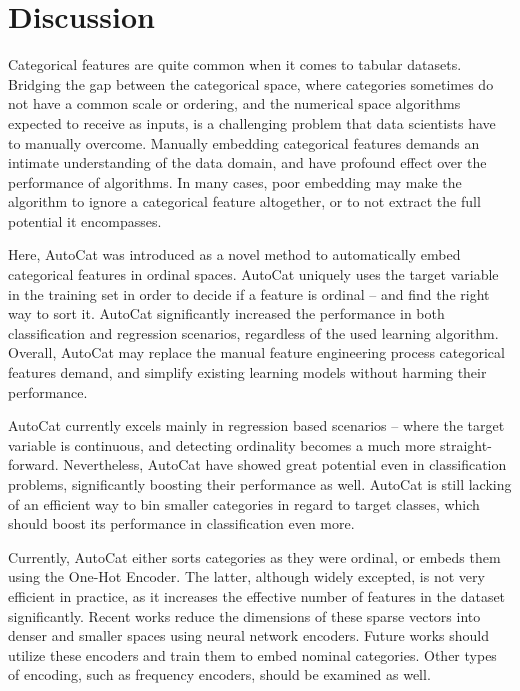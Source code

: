 \documentclass{article}
\begin{document}
\section{Discussion}
Categorical features are quite common when it comes to tabular datasets. Bridging the gap between the categorical space, where categories sometimes do not have a common scale or ordering, and the numerical space algorithms expected to receive as inputs, is a challenging problem that data scientists have to manually overcome. Manually embedding categorical features demands an intimate understanding of the data domain, and have profound effect over the performance of algorithms. In many cases, poor embedding may make the algorithm to ignore a categorical feature altogether, or to not extract the full potential it encompasses.

Here, AutoCat was introduced as a novel method to automatically embed categorical features in ordinal spaces. AutoCat uniquely uses the target variable in the training set in order to decide if a feature is ordinal -- and find the right way to sort it. AutoCat significantly increased the performance in both classification and regression scenarios, regardless of the used learning algorithm. Overall, AutoCat may replace the manual feature engineering process categorical features demand, and simplify existing learning models without harming their performance.

AutoCat currently excels mainly in regression based scenarios -- where the target variable is continuous, and detecting ordinality becomes a much more straight-forward. Nevertheless, AutoCat have showed great potential even in classification problems, significantly boosting their performance as well. AutoCat is still lacking of an efficient way to bin smaller categories in regard to target classes, which should boost its performance in classification even more.

Currently, AutoCat either sorts categories as they were ordinal, or embeds them using the One-Hot Encoder. The latter, although widely excepted, is not very efficient in practice, as it increases the effective number of features in the dataset significantly. Recent works reduce the dimensions of these sparse vectors into denser and smaller spaces using neural network encoders. Future works should utilize these encoders and train them to embed nominal categories. Other types of encoding, such as frequency encoders, should be examined as well.





\end{document}

